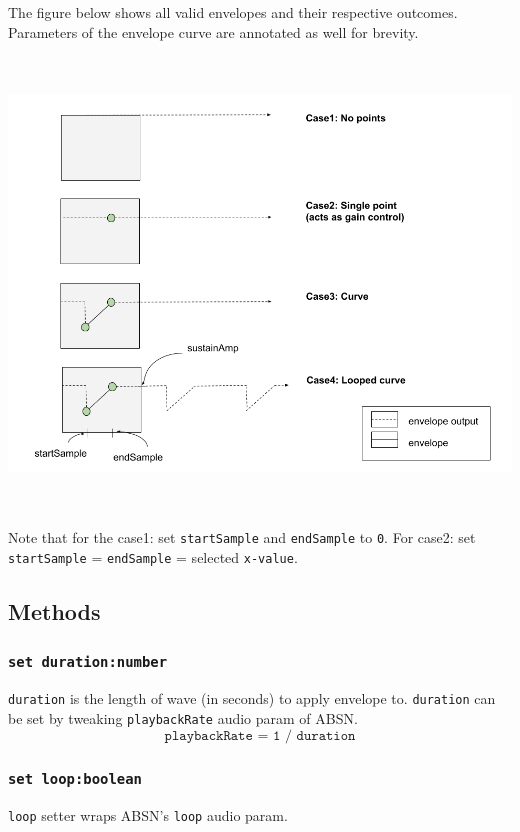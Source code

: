 \documentclass[20pt]{article}
\begin{document}
The figure below shows all valid envelopes and their respective outcomes. Parameters of the envelope curve are annotated as well for brevity.

\includegraphics[width=15cm,height=12cm]{cases.png} 

Note that for the case1: set \texttt{startSample} and \texttt{endSample} to \texttt{0}. For case2: set  \texttt{startSample} = \texttt{endSample} = selected \texttt{x-value}.

\subsection*{Methods}
\subsubsection*{\texttt{set duration:number}}
\texttt{duration} is the length of wave (in seconds) to apply envelope to. \texttt{duration}  can be set by tweaking \texttt{playbackRate} audio param of ABSN.
\begin{equation}
\texttt{playbackRate = 1 / duration}
\end{equation}

\subsubsection*{\texttt{set loop:boolean}}
\texttt{loop} setter wraps ABSN's \texttt{loop} audio param.
\end{document}
